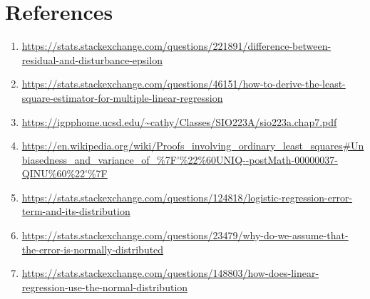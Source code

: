 \section{References}
\begin{enumerate}
    \item \url{https://stats.stackexchange.com/questions/221891/difference-between-residual-and-disturbance-epsilon}
    \item \url{https://stats.stackexchange.com/questions/46151/how-to-derive-the-least-square-estimator-for-multiple-linear-regression}
    \item \url{https://igpphome.ucsd.edu/~cathy/Classes/SIO223A/sio223a.chap7.pdf}
    \item \url{https://en.wikipedia.org/wiki/Proofs_involving_ordinary_least_squares#Unbiasedness_and_variance_of_%7F'%22%60UNIQ--postMath-00000037-QINU%60%22'%7F}
    \item \url{https://stats.stackexchange.com/questions/124818/logistic-regression-error-term-and-its-distribution}
    \item \url{https://stats.stackexchange.com/questions/23479/why-do-we-assume-that-the-error-is-normally-distributed}
    \item \url{https://stats.stackexchange.com/questions/148803/how-does-linear-regression-use-the-normal-distribution}
\end{enumerate}
